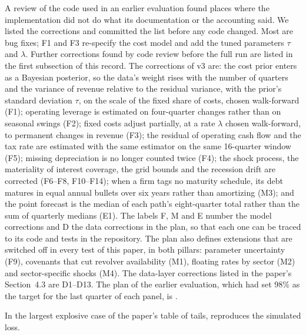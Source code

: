 A review of the code used in an earlier evaluation found places where the implementation did not do what its documentation or the accounting said. We listed the corrections and committed the list before any code changed. Most are bug fixes; F1 and F3 re-specify the cost model and add the tuned parameters $\tau$ and $\lambda$. Further corrections found by code review before the full run are listed in the first subsection of this record. The corrections of v3 are: the cost prior enters as a Bayesian posterior, so the data's weight rises with the number of quarters and the variance of revenue relative to the residual variance, with the prior's standard deviation $\tau$, on the scale of the fixed share of costs, chosen walk-forward (F1); operating leverage is estimated on four-quarter changes rather than on seasonal swings (F2); fixed costs adjust partially, at a rate $\lambda$ chosen walk-forward, to permanent changes in revenue (F3); the residual of operating cash flow and the tax rate are estimated with the same estimator on the same 16-quarter window (F5); missing depreciation is no longer counted twice (F4); the shock process, the materiality of interest coverage, the grid bounds and the recession drift are corrected (F6--F8, F10--F14); when a firm tags no maturity schedule, its debt matures in equal annual bullets over six years rather than amortizing (M3); and the point forecast is the median of each path's eight-quarter total rather than the sum of quarterly medians (E1). The labels F, M and E number the model corrections and D the data corrections in the plan, so that each one can be traced to its code and tests in the repository. The plan also defines extensions that are switched off in every test of this paper, in both pillars: parameter uncertainty (F9), covenants that cut revolver availability (M1), floating rates by sector (M2) and sector-specific shocks (M4). The data-layer corrections listed in the paper's Section~4.3 are D1--D13. The plan of the earlier evaluation, which had set 98\% as the target for the last quarter of each panel, is .

In the largest explosive case of the paper's table of tails,  reproduces the simulated loss.

